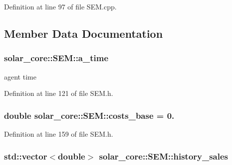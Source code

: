 Definition at line 97 of file S\+E\+M.\+cpp.



\subsection{Member Data Documentation}
\hypertarget{classsolar__core_1_1_s_e_m_a522bb3ecb869a396a797765c9078de12}{}
\subsubsection[{a\+\_\+time}]{ solar\+\_\+core\+::\+S\+E\+M\+::a\+\_\+time\hspace{0.3cm}{\ttfamily [protected]}}\label{classsolar__core_1_1_s_e_m_a522bb3ecb869a396a797765c9078de12}
agent time 

Definition at line 121 of file S\+E\+M.\+h.

\hypertarget{classsolar__core_1_1_s_e_m_a923827d4aefd8df93e1e49944f96a6be}{}
\subsubsection[{costs\+\_\+base}]{\setlength{\rightskip}{0pt plus 5cm}double solar\+\_\+core\+::\+S\+E\+M\+::costs\+\_\+base = 0.\hspace{0.3cm}{\ttfamily [protected]}}\label{classsolar__core_1_1_s_e_m_a923827d4aefd8df93e1e49944f96a6be}


Definition at line 159 of file S\+E\+M.\+h.

\hypertarget{classsolar__core_1_1_s_e_m_ab3d8795e8601541ebcefcaf76d77c67a}{}
\subsubsection[{history\+\_\+sales}]{\setlength{\rightskip}{0pt plus 5cm}std\+::vector$<$double$>$ solar\+\_\+core\+::\+S\+E\+M\+::history\+\_\+sales\hspace{0.3cm}{\ttfamily [protected]}}\label{classsolar__core_1_1_s_e_m_ab3d8795e8601541ebcefcaf76d77c67a}


